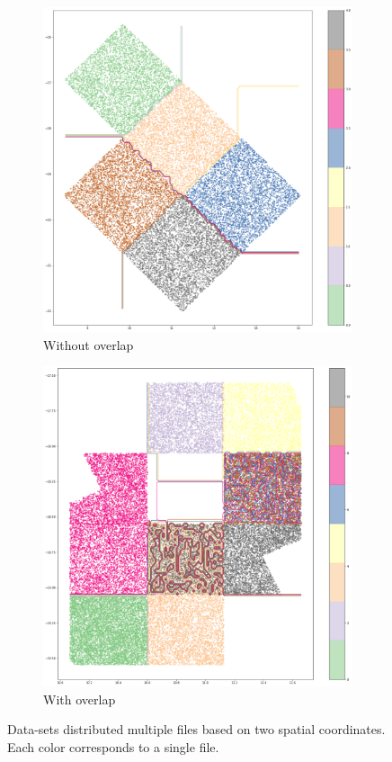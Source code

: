 \begin{figure}[htbp]
    \begin{subfigure}[]{0.5\textwidth}
    \includegraphics[width=\textwidth]{images/6_conclusions/tu_multifile_tree.png}
    \caption{Without overlap}\label{subfig:tu_multifile}
    \end{subfigure}
    \hfill
    \begin{subfigure}[]{0.5\textwidth}
    \includegraphics[width=\textwidth]{images/6_conclusions/mer_multifile_tree.png}
    \caption{With overlap}\label{subfig:mer_multifile}
    \end{subfigure}
    \caption{
        Data-sets distributed multiple files based on two spatial coordinates.
        Each color corresponds to a single file.
    }
    \label{fig:tree_cat_cut}
\end{figure}
